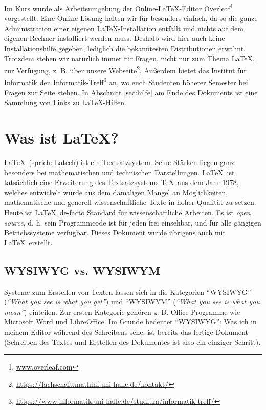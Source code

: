 \documentclass[titlepage, parskip=full*]{scrartcl}
\begin{document}
Im Kurs wurde als Arbeitsumgebung der Online-\LaTeX-Editor Overleaf\footnote{\url{www.overleaf.com}} vorgestellt. Eine Online-Lösung halten wir für besonders einfach, da so die ganze Administration einer eigenen \LaTeX-Installation entfällt und nichts auf dem eigenen Rechner installiert werden muss. Deshalb wird hier auch keine Installationshilfe gegeben, lediglich die bekanntesten Distributionen erwähnt. Trotzdem stehen wir natürlich immer für Fragen, nicht nur zum Thema \LaTeX, zur Verfügung, z. B. über unsere Webseite\footnote{\url{https://fachschaft.mathinf.uni-halle.de/kontakt/}}. Außerdem bietet das Institut für Informatik den Informatik-Treff\footnote{\url{https://www.informatik.uni-halle.de/studium/informatik-treff/}} an, wo euch Studenten höherer Semester bei Fragen zur Seite stehen. In Abschnitt \ref{sec:hilfe} am Ende des Dokuments ist eine Sammlung von Links zu \LaTeX-Hilfen.




\section{Was ist \LaTeX?}\label{sec:was_ist_das}
\LaTeX\ (sprich: Latech) ist ein Textsatzsystem. Seine Stärken liegen ganz besonders bei mathematischen und technischen Darstellungen. \LaTeX\ ist tatsächlich eine Erweiterung des Textsatzsystems \TeX\ aus dem Jahr 1978, welches entwickelt wurde aus dem damaligen Mangel an Möglichkeiten, mathematische und generell wissenschaftliche Texte in hoher Qualität zu setzen. Heute ist \LaTeX\ de-facto Standard für wissenschaftliche Arbeiten. Es ist \emph{open source}, d. h. sein Programmcode ist für jeden frei einsehbar, und für alle gängigen Betriebssysteme verfügbar. Dieses Dokument wurde übrigens auch mit \LaTeX\ erstellt.


\subsection{WYSIWYG vs. WYSIWYM}
Systeme zum Erstellen von Texten lassen sich in die Kategorien \enquote{WYSIWYG} (\emph{\enquote{What you see is what you get}}) und \enquote{WYSIWYM} (\emph{\enquote{What you see is what you mean}}) einteilen. Zur ersten Kategorie gehören z. B. Office-Programme wie Microsoft Word und LibreOffice. Im Grunde bedeutet \enquote{WYSIWYG}: Was ich in meinem Editor während des Schreibens sehe, ist bereits das fertige Dokument (Schreiben des Textes und Erstellen des Dokumentes ist also ein einziger Schritt). 
\end{document}
